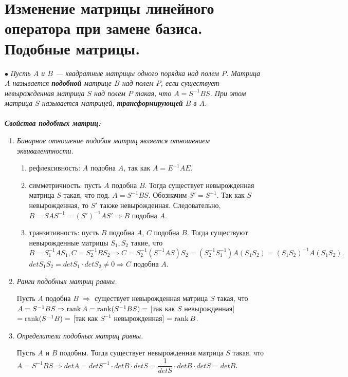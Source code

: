 \section{Изменение матрицы линейного оператора при замене базиса. Подобные матрицы.}
$\bullet$ \textit{Пусть $A$ и $B$ --- квадратные матрицы одного порядка над полем $P$. Матрица $A$ называется \textbf{подобной} матрице $B$ над полем $P$, если существует невырожденная матрица $S$ над полем $P$ такая, что $A = S^{-1}BS$. При этом матрица $S$ называется матрицей, \textbf{трансформирующей} $B$ в $A$.}\\\\
\textit{ \textbf{Свойства подобных матриц:}}
\begin{enumerate}
	\item \textit{Бинарное отношение подобия матриц является отношением эквивалентности.}\begin{Proof}\begin{enumerate}
			\item рефлексивность: $A$ подобна $A$, так как $A = E^{-1}AE$.
			\item симметричность: пусть $A$ подобна $B$. Тогда существует невырожденная матрица $S$ такая, что под. $A = S^{-1}BS$. Обозначим $S' = S^{-1}$. Так как $S$ невырожденная, то $S'$ также невырожденная. Следовательно, $B = S A S^{-1} = (S')^{-1} A S' \Rightarrow B$ подобна $A$.
			\item транзитивность: пусть $B$ подобна $A$, $C$ подобна $B$. Тогда существуют невырожденные матрицы $S_1, S_2$ такие, что $B = S_1^{-1}AS_1, C = S_2^{-1}BS_2\Rightarrow C = S_2^{-1}(S^{-1}AS)S_2= (S_2^{-1}S_1^{-1})A(S_1S_2) = (S_1S_2)^{-1}A(S_1S_2).$ $detS_1S_2 = detS_1\cdot detS_2 \ne 0\Rightarrow C$ подобна $A$.
		\end{enumerate}
	\end{Proof}
	\item \textit{Ранги подобных матриц равны.}\begin{Proof}
		Пусть $A$ подобна $B$ $\Rightarrow$ существует невырожденная матрица $S$ такая, что $A = S^{-1} B S \Rightarrow \operatorname{rank}  A = \operatorname{rank}   (S^{-1} B S ) =$ [так как $S$ невырожденная] $ = \operatorname{rank}  (S^{-1} B) =$ [так как $S^{-1}$ невырожденная] $= \operatorname{rank}  B$.
	\end{Proof}
	\item \textit {Определители подобных матриц равны.}\begin{Proof}
		Пусть $A$ и $B$ подобны. Тогда существует невырожденная матрица $S$ такая, что $A = S^{-1}BS\Rightarrow det A = detS^{-1}\cdot det B\cdot detS = \dfrac{1}{detS}\cdot detB\cdot detS = det B$.
\end{Proof}\end{enumerate}
